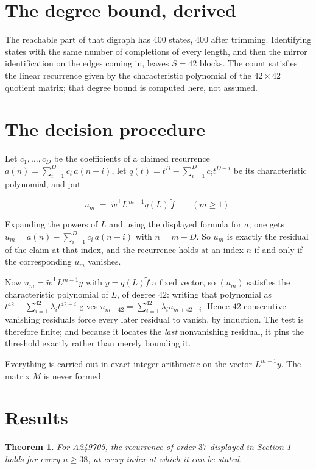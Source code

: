 \documentclass[11pt]{article}
\newtheorem{theorem}{Theorem}
\theoremstyle{definition}
\begin{document}
\section{The degree bound, derived}

The reachable part of that digraph has $400$ states, $400$ after trimming. Identifying states with the same number of completions of every length, and then the mirror identification on the edges coming in, leaves $S = 42$ blocks. The count satisfies the linear recurrence given by the characteristic polynomial of the $42\times42$ quotient matrix; that degree bound is computed here, not assumed.

\section{The decision procedure}

Let $c_1,\dots,c_D$ be the coefficients of a claimed recurrence $a(n) = \sum_{i=1}^{D} c_i\,a(n-i)$, let $q(t) = t^{D} - \sum_{i=1}^{D} c_i t^{D-i}$ be its characteristic polynomial, and put

\[u_m \;=\; \tilde w^{\mathsf T} L^{\,m-1} q(L)\,\tilde f \qquad (m \ge 1).\]

Expanding the powers of $L$ and using the displayed formula for $a$, one gets $u_m = a(n) - \sum_{i=1}^{D} c_i\,a(n-i)$ with $n = m + D$. So $u_m$ is exactly the residual of the claim at that index, and the recurrence holds at an index $n$ if and only if the corresponding $u_m$ vanishes.

Now $u_m = \tilde w^{\mathsf T} L^{m-1} y$ with $y = q(L)\tilde f$ a fixed vector, so $(u_m)$ satisfies the characteristic polynomial of $L$, of degree $42$: writing that polynomial as $t^{42} - \sum_{i=1}^{42} \lambda_i t^{42-i}$ gives $u_{m+42} = \sum_{i=1}^{42} \lambda_i u_{m+42-i}$. Hence $42$ consecutive vanishing residuals force every later residual to vanish, by induction. The test is therefore finite; and because it locates the {\itshape last} nonvanishing residual, it pins the threshold exactly rather than merely bounding it.

Everything is carried out in exact integer arithmetic on the vector $L^{m-1}y$. The matrix $M$ is never formed.

\section{Results}

\begin{theorem} For A249705, the recurrence of order $37$ displayed in Section 1 holds for every $n \ge 38$, at every index at which it can be stated.\end{theorem}
\end{document}
